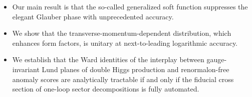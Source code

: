 \begin{itemize}
  \item Our main result is that the so-called generalized soft function suppresses the elegant Glauber phase with unprecedented accuracy.
  \item We show that the transverse-momentum-dependent distribution, which enhances form factors, is unitary at next-to-leading logarithmic accuracy.
  \item We establish that the Ward identities of the interplay between gauge-invariant Lund planes of double Higgs production and renormalon-free anomaly scores are analytically tractable if and only if the fiducial cross section of one-loop sector decompositions is fully automated.
\end{itemize}

